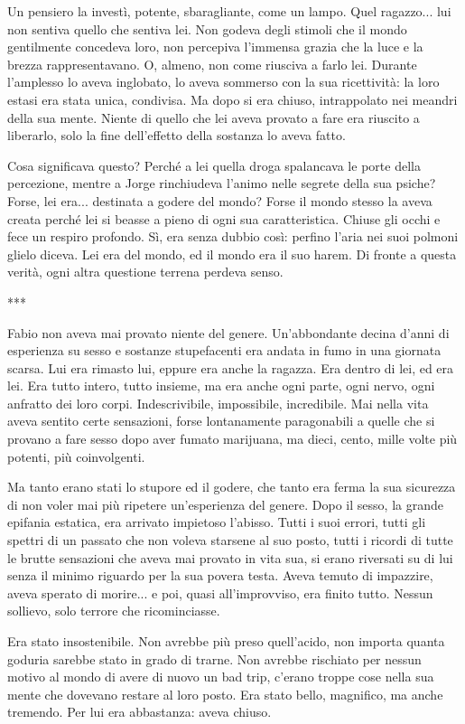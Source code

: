 Un pensiero la investì, potente, sbaragliante, come un lampo. Quel ragazzo... lui non sentiva quello che sentiva lei. Non godeva degli stimoli che il mondo gentilmente concedeva loro, non percepiva l'immensa grazia che la luce e la brezza rappresentavano. O, almeno, non come riusciva a farlo lei. Durante l'amplesso lo aveva inglobato, lo aveva sommerso con la sua ricettività: la loro estasi era stata unica, condivisa. Ma dopo si era chiuso, intrappolato nei meandri della sua mente. Niente di quello che lei aveva provato a fare era riuscito a liberarlo, solo la fine dell'effetto della sostanza lo aveva fatto.

Cosa significava questo? Perché a lei quella droga spalancava le porte della percezione, mentre a Jorge rinchiudeva l'animo nelle segrete della sua psiche? Forse, lei era... destinata a godere del mondo? Forse il mondo stesso la aveva creata perché lei si beasse a pieno di ogni sua caratteristica. Chiuse gli occhi e fece un respiro profondo. Sì, era senza dubbio così: perfino l'aria nei suoi polmoni glielo diceva. Lei era del mondo, ed il mondo era il suo harem. Di fronte a questa verità, ogni altra questione terrena perdeva senso.

***

Fabio non aveva mai provato niente del genere. Un'abbondante decina d'anni di esperienza su sesso e sostanze stupefacenti era andata in fumo in una giornata scarsa. Lui era rimasto lui, eppure era anche la ragazza. Era dentro di lei, ed era lei. Era tutto intero, tutto insieme, ma era anche ogni parte, ogni nervo, ogni anfratto dei loro corpi. Indescrivibile, impossibile, incredibile. Mai nella vita aveva sentito certe sensazioni, forse lontanamente paragonabili a quelle che si provano a fare sesso dopo aver fumato marijuana, ma dieci, cento, mille volte più potenti, più coinvolgenti.

Ma tanto erano stati lo stupore ed il godere, che tanto era ferma la sua sicurezza di non voler mai più ripetere un'esperienza del genere. Dopo il sesso, la grande epifania estatica, era arrivato impietoso l'abisso. Tutti i suoi errori, tutti gli spettri di un passato che non voleva starsene al suo posto, tutti i ricordi di tutte le brutte sensazioni che aveva mai provato in vita sua, si erano riversati su di lui senza il minimo riguardo per la sua povera testa. Aveva temuto di impazzire, aveva sperato di morire... e poi, quasi all'improvviso, era finito tutto. Nessun sollievo, solo terrore che ricominciasse.

Era stato insostenibile. Non avrebbe più preso quell'acido, non importa quanta goduria sarebbe stato in grado di trarne. Non avrebbe rischiato per nessun motivo al mondo di avere di nuovo un bad trip, c'erano troppe cose nella sua mente che dovevano restare al loro posto. Era stato bello, magnifico, ma anche tremendo. Per lui era abbastanza: aveva chiuso.

